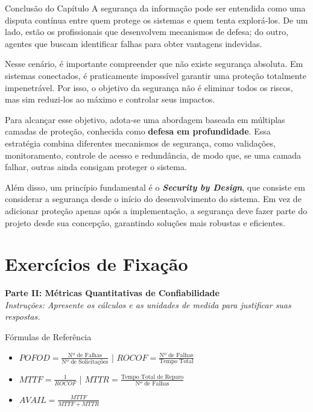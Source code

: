 \documentclass[12pt,a4paper,twoside]{report}
\begin{document}
\begin{block}{Conclusão do Capítulo}
A segurança da informação pode ser entendida como uma disputa contínua entre quem protege os sistemas e quem tenta explorá-los. De um lado, estão os profissionais que desenvolvem mecanismos de defesa; do outro, agentes que buscam identificar falhas para obter vantagens indevidas.

Nesse cenário, é importante compreender que não existe segurança absoluta. Em sistemas conectados, é praticamente impossível garantir uma proteção totalmente impenetrável. Por isso, o objetivo da segurança não é eliminar todos os riscos, mas sim reduzi-los ao máximo e controlar seus impactos.

Para alcançar esse objetivo, adota-se uma abordagem baseada em múltiplas camadas de proteção, conhecida como \textbf{defesa em profundidade}. Essa estratégia combina diferentes mecanismos de segurança, como validações, monitoramento, controle de acesso e redundância, de modo que, se uma camada falhar, outras ainda consigam proteger o sistema.

Além disso, um princípio fundamental é o \textbf{\emph{Security by Design}}, que consiste em considerar a segurança desde o início do desenvolvimento do sistema. Em vez de adicionar proteção apenas após a implementação, a segurança deve fazer parte do projeto desde sua concepção, garantindo soluções mais robustas e eficientes.\end{block}

\appendix

\chapter{Exercícios de Fixação}


\begin{center}
  {\Large \textbf{Parte II: Métricas Quantitativas de Confiabilidade}}\\[0.2cm]
  \textit{Instruções: Apresente os cálculos e as unidades de medida para justificar suas respostas.}
\end{center}

\vspace{0.4cm}

\begin{block}{Fórmulas de Referência}
    \small
    \begin{itemize}
        \item $POFOD = \frac{\text{Nº de Falhas}}{\text{Nº de Solicitações}}$ \quad | \quad $ROCOF = \frac{\text{Nº de Falhas}}{\text{Tempo Total}}$
        \item $MTTF = \frac{1}{ROCOF}$ \quad | \quad $MTTR = \frac{\text{Tempo Total de Reparo}}{\text{Nº de Falhas}}$
        \item $AVAIL = \frac{MTTF}{MTTF + MTTR}$
    \end{itemize}
\end{block}
\end{document}
